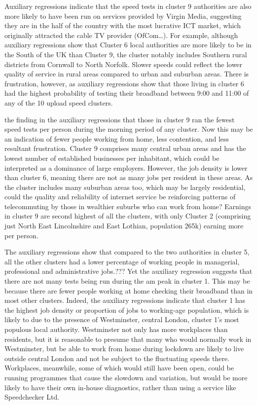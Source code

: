 \documentclass[]{interact}
\theoremstyle{plain}%
\theoremstyle{definition}
\theoremstyle{remark}
\begin{document}
Auxiliary regressions indicate that the speed tests in cluster 9
authorities are also more likely to have been run on services provided
by Virgin Media, suggesting they are in the half of the country with the
most lucrative ICT market, which originally attracted the cable TV
provider (OfCom\ldots). For example, although auxiliary regressions show
that Cluster 6 local authorities are more likely to be in the South of
the UK than Cluster 9, the cluster notably includes Southern rural
districts from Cornwall to North Norfolk. Slower speeds could reflect
the lower quality of service in rural areas compared to urban and
suburban areas. There is frustration, however, as auxiliary regressions
show that those living in cluster 6 had the highest probability of
testing their broadband between 9:00 and 11:00 of any of the 10 upload
speed clusters.

the finding in the auxiliary regressions that those in cluster 9 ran the
fewest speed tests per person during the morning period of any cluster.
Now this may be an indication of fewer people working from home, less
contention, and less resultant frustration. Cluster 9 comprises many
central urban areas and has the lowest number of established businesses
per inhabitant, which could be interpreted as a dominance of large
employers. However, the job density is lower than cluster 6, meaning
there are not as many jobs per resident in these areas. As the cluster
includes many suburban areas too, which may be largely residential,
could the quality and reliability of internet service be reinforcing
patterns of telecommuting by those in wealthier suburbs who can work
from home? Earnings in cluster 9 are second highest of all the clusters,
with only Cluster 2 (comprising just North East Lincolnshire and East
Lothian, population 265k) earning more per person.

The auxiliary regressions show that compared to the two authorities in
cluster 5, all the other clusters had a lower percentage of working
people in managerial, professional and administrative jobs.??? Yet the
auxiliary regression suggests that there are not many tests being run
during the am peak in cluster 1. This may be because there are fewer
people working at home checking their broadband than in most other
clusters. Indeed, the auxiliary regressions indicate that cluster 1 has
the highest job density or proportion of jobs to working-age population,
which is likely to due to the presence of Westminster, central London,
cluster 1's most populous local authority. Westminster not only has more
workplaces than residents, but it is reasonable to presume that many who
would normally work in Westminster, but be able to work from home during
lockdown are likely to live outside central London and not be subject to
the fluctuating speeds there. Workplaces, meanwhile, some of which would
still have been open, could be running programmes that cause the
slowdown and variation, but would be more likely to have their own
in-house diagnostics, rather than using a service like Speedchecker Ltd.
\end{document}

